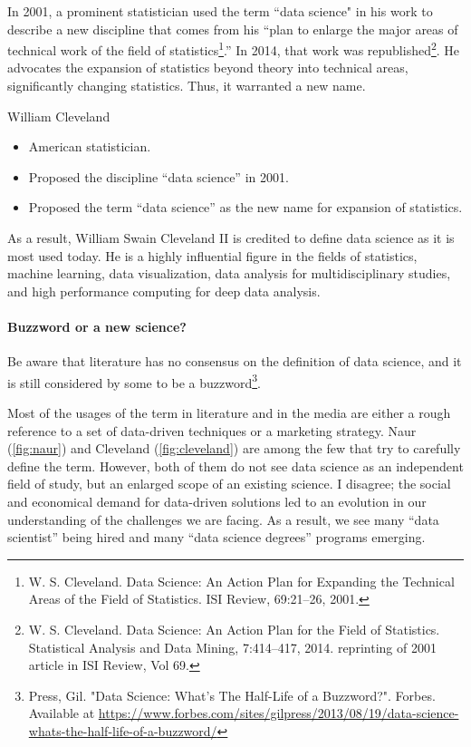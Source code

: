 In 2001, a prominent statistician used the term ``data science" in his work to describe a
new discipline that comes from his ``plan to enlarge the major areas of technical work of
the field of statistics\footnote{W. S. Cleveland. Data Science: An Action Plan for
Expanding the Technical Areas of the Field of Statistics. ISI Review, 69:21–26, 2001.}.''
In 2014, that work was republished\footnote{W. S. Cleveland.
Data Science: An Action Plan for the Field of Statistics. Statistical Analysis and Data
Mining, 7:414–417, 2014. reprinting of 2001 article in ISI Review, Vol 69.}.
He advocates the expansion of statistics beyond theory into technical areas, significantly
changing statistics.  Thus, it warranted a new name.

\begin{mainbox}{William Cleveland}
  \begin{itemize}
    \item American statistician.
    \item Proposed the discipline ``data science'' in 2001.
    \item Proposed the term ``data science'' as the new name for expansion of statistics.
  \end{itemize}
\end{mainbox}

As a result, William Swain Cleveland II is credited to define data science as it is most
used today. He is a highly influential figure in the fields of statistics, machine
learning, data visualization, data analysis for multidisciplinary studies, and high
performance computing for deep data analysis.

\paragraph{Buzzword or a new science?}

Be aware that literature has no consensus on the definition of data science, and it is still considered
by some to be a buzzword\footnote{Press, Gil. "Data Science: What's The Half-Life of a
Buzzword?". Forbes. Available at
\url{https://www.forbes.com/sites/gilpress/2013/08/19/data-science-whats-the-half-life-of-a-buzzword/}}.

Most of the usages of the term in literature and in the media are either a rough
reference to a set of data-driven techniques or a marketing strategy.  Naur
(\cref{fig:naur}) and Cleveland (\cref{fig:cleveland}) are among the few that try to
carefully define the term.  However, both of them do not see data science as an
independent field of study, but an enlarged scope of an existing science.  I disagree;
the social and economical demand for data-driven solutions led to an evolution in our
understanding of the challenges we are facing.  As a result, we see many ``data
scientist'' being hired and many ``data science degrees'' programs emerging.

